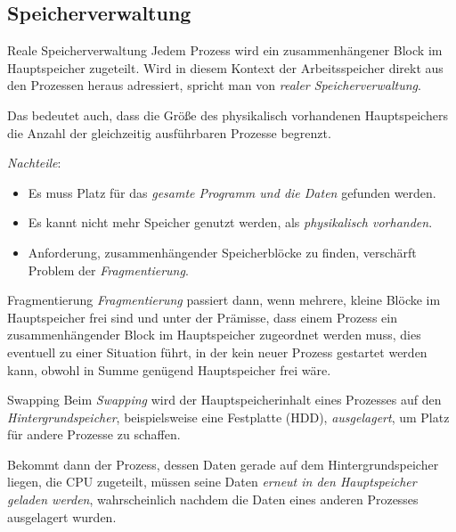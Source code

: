 \documentclass[german]{spicker}
\begin{document}
\subsection{Speicherverwaltung}

\begin{defi}{Reale Speicherverwaltung}
    Jedem Prozess wird ein zusammenhängener Block im Hauptspeicher zugeteilt.
    Wird in diesem Kontext der Arbeitsspeicher direkt aus den Prozessen heraus adressiert, spricht man von \emph{realer Speicherverwaltung}.

    Das bedeutet auch, dass die Größe des physikalisch vorhandenen Hauptspeichers die Anzahl der gleichzeitig ausführbaren Prozesse begrenzt.

    \emph{Nachteile}:
    \begin{itemize}
        \item Es muss Platz für das \emph{gesamte Programm und die Daten} gefunden werden.
        \item Es kannt nicht mehr Speicher genutzt werden, als \emph{physikalisch vorhanden}.
        \item Anforderung, zusammenhängender Speicherblöcke zu finden, verschärft Problem der \emph{Fragmentierung}.
    \end{itemize}
\end{defi}

\begin{bonus}{Fragmentierung}
    \emph{Fragmentierung} passiert dann, wenn mehrere, kleine Blöcke im Hauptspeicher frei sind und unter der Prämisse, dass einem
    Prozess ein zusammenhängender Block im Hauptspeicher zugeordnet werden
    muss, dies eventuell zu einer Situation führt, in der kein neuer Prozess gestartet
    werden kann, obwohl in Summe genügend Hauptspeicher frei wäre.
\end{bonus}

\begin{defi}{Swapping}
    Beim \emph{Swapping} wird der
    Hauptspeicherinhalt eines Prozesses auf den \emph{Hintergrundspeicher}, beispielsweise
    eine Festplatte (HDD), \emph{ausgelagert}, um Platz für andere Prozesse zu schaffen.

    Bekommt dann der Prozess, dessen Daten gerade auf dem Hintergrundspeicher liegen,
    die CPU zugeteilt, müssen seine Daten \emph{erneut in den Hauptspeicher geladen werden},
    wahrscheinlich nachdem die Daten eines anderen Prozesses ausgelagert wurden.
\end{defi}
\end{document}

